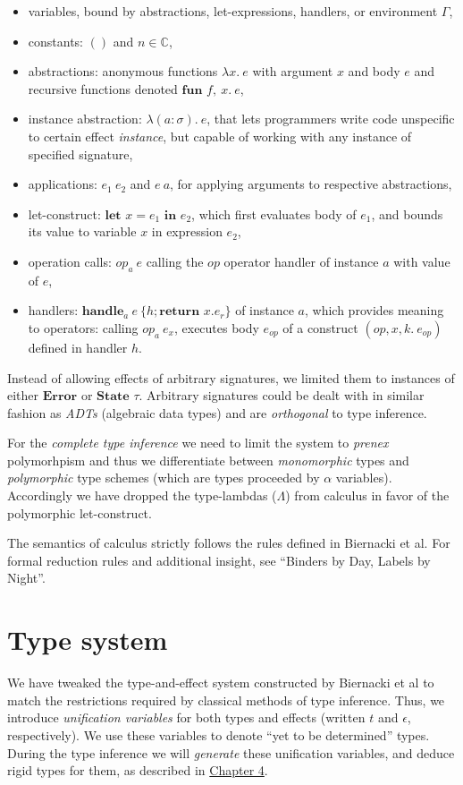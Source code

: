 \documentclass[declaration,shortabstract]{iithesis}
\theoremstyle{definition} \newtheorem{definition}{Definition}[section]
\newcommand{\lam}[1][x]{\ensuremath{\lambda #1.\:}}
\newcommand{\fun}[1][f,\:x]{\ensuremath{\textbf{fun } #1.\:}}
\begin{document}
\begin{itemize}
    \item variables, bound by abstractions, let-expressions, handlers, or environment $\Gamma$,
    \item constants: $()$ and $n \in \mathbb{C}$,
    \item abstractions: anonymous functions $\lam e$ with argument $x$ and body $e$ and recursive functions denoted $\fun e$,
    \item instance abstraction: $\lam[(a:\sigma)]e$, that lets programmers write code
    unspecific to certain effect \textit{instance}, but capable of working with any
    instance of specified signature,
    \item applications: $e_1\:e_2$ and $e\:a$, for applying arguments to respective abstractions, 
    \item let-construct: $\textbf{let } x = e_1 \textbf{ in } e_2$, which first evaluates body of $e_1$,
    and bounds its value to variable $x$ in expression $e_2$,
    \item operation calls: $op_a\:e$ calling the $op$ operator handler of instance $a$ with value
    of $e$,
    \item handlers: $\textbf{handle}_a \: e\: \{h;\textbf{return } x. e_r\}$ of instance $a$, 
    which provides meaning to operators: calling $op_a\:e_x$, executes body $e_{op}$ of
    a construct $(op, x, k.\:e_{op})$ defined in handler $h$.
\end{itemize}

Instead of allowing effects of arbitrary signatures, we limited them to instances
of either $\textbf{Error}$ or  $\textbf{State }\tau$.
Arbitrary signatures could be dealt with in similar fashion as \textit{ADTs}
(algebraic data types) and are \textit{orthogonal} to type inference.

For the \textit{complete type inference} we need to limit the system to \textit{prenex}
polymorhpism and thus we differentiate between \textit{monomorphic} types and \textit{polymorphic}
type schemes (which are types proceeded by $\alpha$ variables).
Accordingly we have dropped the type-lambdas ($\Lambda$) from calculus in favor of the
polymorphic let-construct.

The semantics of calculus strictly follows the rules defined in Biernacki et al.
For formal reduction rules and additional insight, see ``Binders by Day, Labels by Night''\cite{binders-labels}.
\chapter{Type system}
We have tweaked the type-and-effect system constructed by Biernacki et al\cite{binders-labels}
to match the restrictions required by classical methods of type inference.
Thus, we introduce \textit{unification variables} for both types and effects
(written $t$ and $\epsilon$, respectively).
We use these variables to denote ``yet to be determined'' types.
During the type inference we will \textit{generate} these unification variables,
and deduce rigid types for them, as described in \hyperlink{chapter.4}{Chapter 4}.
\end{document}
